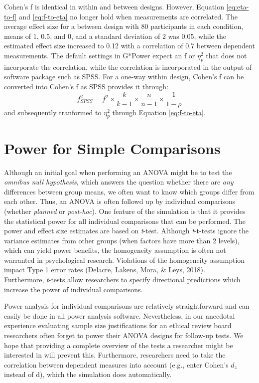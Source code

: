\documentclass[,jou, draftfirst, a4paper,floatsintext]{apa6}
\begin{document}
Cohen's f is identical in within and between designs.
However, Equation \eqref{eq:eta-to-f} and \eqref{eq:f-to-eta} no longer hold when measurements are correlated.
The average effect size for a between design with 80 participants in each condition, means of 1, 0.5, and 0, and a standard deviation of 2 was 0.05, while the estimated effect size increased to 0.12 with a correlation of 0.7 between dependent measurements.
The default settings in G*Power expect an f or \(\eta_p^2\) that does not incorporate the correlation, while the correlation is incorporated in the output of software package such as SPSS.
For a one-way within design, Cohen's f can be converted into Cohen's f as SPSS provides it through:
\begin{equation}
f^2_{SPSS} = f^2 \times \frac{k}{k-1} \times \frac{n}{n-1} \times \frac{1}{1-\rho}
\end{equation}
and subsequently tranformed to \(\eta_p^2\) through Equation \eqref{eq:f-to-eta}.

\hypertarget{power-for-simple-comparisons}{%
\section{Power for Simple Comparisons}\label{power-for-simple-comparisons}}

Although an initial goal when performing an ANOVA might be to test the \emph{omnibus null hypothesis}, which answers the question whether there are \emph{any} differences between group means, we often want to know which groups differ from each other. Thus, an ANOVA is often followd up by individual comparisons (whether \emph{planned} or \emph{post-hoc}).
One feature of the simulation is that it provides the statistical power for all individual comparisons that can be performed.
The power and effect size estimates are based on \emph{t}-test.
Although \emph{t}-t-tests ignore the variance estimates from other groups (when factors have more than 2 levels), which can yield power benefits, the homogeneity assumption is often not warranted in psychological research.
Violations of the homogeneity assumption impact Type 1 error rates (Delacre, Lakens, Mora, \& Leys, 2018).\\
Furthermore, \emph{t}-tests allow researchers to specify directional predictions which increase the power of individual comparisons.

Power analysis for individual comparisons are relatively straightforward and can easily be done in all power analysis software.
Nevertheless, in our anecdotal experience evaluating sample size justifications for an ethical review board researchers often forget to power their ANOVA designs for follow-up tests.
We hope that providing a complete overview of the tests a researcher might be interested in will prevent this.
Furthermore, researchers need to take the correlation between dependent measures into account (e.g., enter Cohen's \(d_z\) instead of d), which the simulation does automatically.
\end{document}
